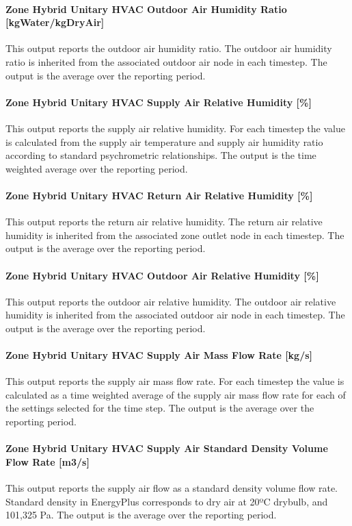 \paragraph{Zone Hybrid Unitary HVAC Outdoor Air Humidity Ratio [kgWater/kgDryAir]}
This output reports the outdoor air humidity ratio.  The outdoor air humidity ratio is inherited from the associated outdoor air node in each timestep. The output is the average over the reporting period.

\paragraph{Zone Hybrid Unitary HVAC Supply Air Relative Humidity [\%]}
This output reports the supply air relative humidity. For each timestep the value is calculated  from the supply air temperature and supply air humidity ratio according to standard psychrometric relationships. The output is the time weighted average over the reporting period.

\paragraph{Zone Hybrid Unitary HVAC Return Air Relative Humidity [\%]}
This output reports the return air relative humidity. The return air relative humidity is inherited from the associated zone outlet node in each timestep. The output is the average over the reporting period.

\paragraph{Zone Hybrid Unitary HVAC Outdoor Air Relative Humidity [\%]}
This output reports the outdoor air relative humidity. The outdoor air relative humidity is inherited from the associated outdoor air node in each timestep. The output is the average over the reporting period.

\paragraph{Zone Hybrid Unitary HVAC Supply Air Mass Flow Rate [kg/s]}
This output reports the supply air mass flow rate. For each timestep the value is calculated as a time weighted average of the supply air mass flow rate for each of the settings selected for the time step. The output is the average over the reporting period.

\paragraph{Zone Hybrid Unitary HVAC Supply Air Standard Density Volume Flow Rate [m3/s]}
This output reports the supply air flow as a standard density volume flow rate. Standard density in EnergyPlus corresponds to dry air at 20º\si{C} drybulb, and 101,325 Pa. The output is the average over the reporting period.

